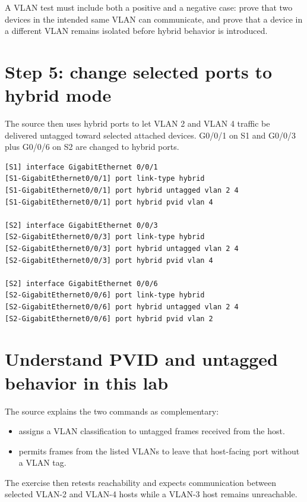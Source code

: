 
\begin{verifybox}
A VLAN test must include both a positive and a negative case: prove that two devices in the intended same VLAN can communicate, and prove that a device in a different VLAN remains isolated before hybrid behavior is introduced.
\end{verifybox}

\section{Step 5: change selected ports to hybrid mode}
The source then uses hybrid ports to let VLAN 2 and VLAN 4 traffic be delivered untagged toward selected attached devices. G0/0/1 on S1 and G0/0/3 plus G0/0/6 on S2 are changed to hybrid ports.
\begin{lstlisting}[style=dcnterminal]
[S1] interface GigabitEthernet 0/0/1
[S1-GigabitEthernet0/0/1] port link-type hybrid
[S1-GigabitEthernet0/0/1] port hybrid untagged vlan 2 4
[S1-GigabitEthernet0/0/1] port hybrid pvid vlan 4

[S2] interface GigabitEthernet 0/0/3
[S2-GigabitEthernet0/0/3] port link-type hybrid
[S2-GigabitEthernet0/0/3] port hybrid untagged vlan 2 4
[S2-GigabitEthernet0/0/3] port hybrid pvid vlan 4

[S2] interface GigabitEthernet 0/0/6
[S2-GigabitEthernet0/0/6] port link-type hybrid
[S2-GigabitEthernet0/0/6] port hybrid untagged vlan 2 4
[S2-GigabitEthernet0/0/6] port hybrid pvid vlan 2
\end{lstlisting}

\section{Understand PVID and untagged behavior in this lab}
The source explains the two commands as complementary:
\begin{itemize}
\item {} assigns a VLAN classification to untagged frames received from the host.
\item {} permits frames from the listed VLANs to leave that host-facing port without a VLAN tag.
\end{itemize}
The exercise then retests reachability and expects communication between selected VLAN-2 and VLAN-4 hosts while a VLAN-3 host remains unreachable.

